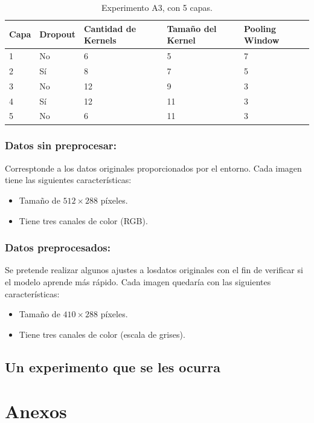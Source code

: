 \documentclass[journal]{IEEEtran}
\begin{document}
        \begin{table}[h!]
            \centering
            \begin{tabular}{@{}lllll@{}}
                \toprule
                Capa & Dropout & Cantidad de Kernels & Tamaño del Kernel & Pooling Window \\ \midrule
                1    & No      & 6                   & 5                 & 7              \\
                2    & Sí      & 8                   & 7                 & 5              \\
                3    & No      & 12                  & 9                 & 3              \\
                4    & Sí      & 12                  & 11                & 3              \\
                5    & No      & 6                   & 11                & 3              \\ \bottomrule
            \end{tabular}
            \caption{Experimento A3, con 5 capas.\label{tab:A3}}
            \end{table}

    \subsubsection{Datos sin preprocesar:} Corresptonde a los datos originales proporcionados por el entorno. Cada imagen tiene las siguientes características:
    \begin{itemize}
        \item Tamaño de $512\times288$ píxeles.
        \item Tiene tres canales de color (RGB).
    \end{itemize}

    \subsubsection{Datos preprocesados:} Se pretende realizar algunos ajustes a losdatos originales con el fin de verificar si el modelo aprende más rápido. Cada imagen quedaría con las siguientes características:
    \begin{itemize}
        \item Tamaño de $410\times288$ píxeles.
        \item Tiene tres canales de color (escala de grises).
    \end{itemize}

\subsection{Un experimento que se les ocurra}






\section*{Anexos}

    
\end{document}
